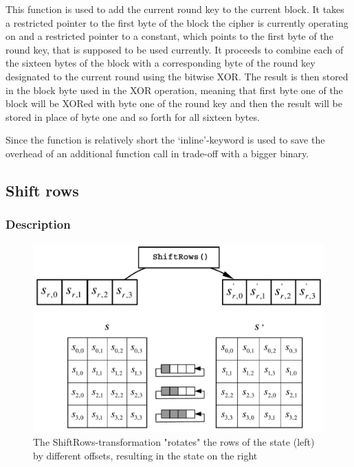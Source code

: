 This function is used to add the current round key to the current block.
It takes a restricted pointer to the first byte of the block the cipher
is currently operating on and a restricted pointer to a constant, which
points to the first byte of the round key, that is supposed to be used
currently. It proceeds to combine each of the sixteen bytes of the block
with a corresponding byte of the round key designated to the current
round using the bitwise XOR. The result is then stored in the block byte
used in the XOR operation, meaning that first byte one of the block will
be XORed with byte one of the round key and then the result will be
stored in place of byte one and so forth for all sixteen bytes.

Since the function is relatively short the `inline'-keyword is used to
save the overhead of an additional function call in trade-off with a
bigger binary.

\hypertarget{shift-rows}{%
\subsection{Shift rows}\label{shift-rows}}

\hypertarget{description-3}{%
\subsubsection{Description}\label{description-3}}

\begin{figure}
\centering
\includegraphics[scale = 0.3]{data/figures/shiftrows.png}
\caption{The ShiftRows-transformation "rotates" the rows of the state (left) by different offsets, resulting in the state on the right}
\end{figure}

